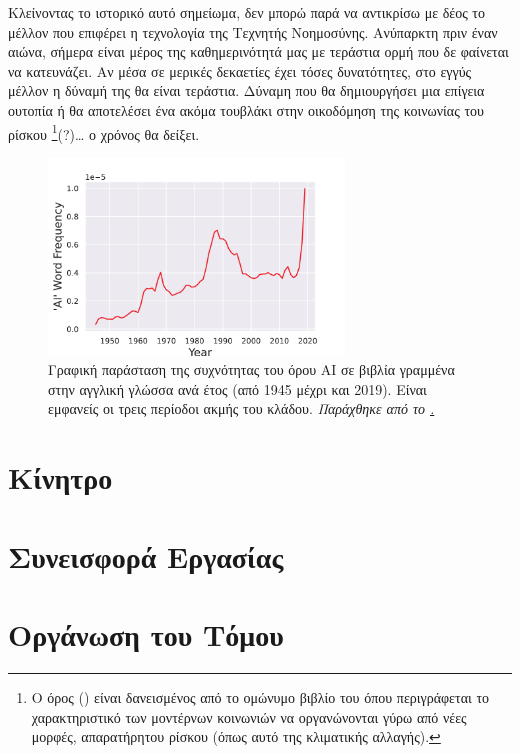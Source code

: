 Κλείνοντας το ιστορικό αυτό σημείωμα, δεν μπορώ παρά να αντικρίσω με δέος το μέλλον που επιφέρει η τεχνολογία της Τεχνητής Νοημοσύνης. Ανύπαρκτη πριν έναν αιώνα, σήμερα είναι μέρος της καθημερινότητά μας με τεράστια ορμή που δε φαίνεται να κατευνάζει. Αν μέσα σε μερικές δεκαετίες έχει τόσες δυνατότητες, στο εγγύς μέλλον η δύναμή της θα είναι τεράστια. Δύναμη που θα δημιουργήσει μια επίγεια ουτοπία ή θα αποτελέσει ένα ακόμα τουβλάκι στην οικοδόμηση της κοινωνίας του ρίσκου \footnote{Ο όρος  () είναι δανεισμένος από το ομώνυμο βιβλίο του  \cite{beck2014risk} όπου περιγράφεται το χαρακτηριστικό των μοντέρνων κοινωνιών να οργανώνονται γύρω από νέες μορφές, απαρατήρητου ρίσκου (όπως αυτό της κλιματικής αλλαγής).}(?)… ο χρόνος θα δείξει.


\begin{figure}[h]
    \centering
    \includegraphics[width=0.7\textwidth]{images/introduction/ngramAI_good.pdf}
    \caption{Γραφική παράσταση της συχνότητας του όρου AI σε βιβλία γραμμένα στην αγγλική γλώσσα ανά έτος (από 1945 μέχρι και 2019). Είναι εμφανείς οι τρεις περίοδοι ακμής του κλάδου. \textit{Παράχθηκε από το \href{https://books.google.com/ngrams}{.}} }
\end{figure}



\section{Κίνητρο}
\en{\blindtext[3]}
\section{Συνεισφορά Εργασίας}
\en{\blindtext[3]}
\section{Οργάνωση του Τόμου}

\en{\blindtext[3]} 
